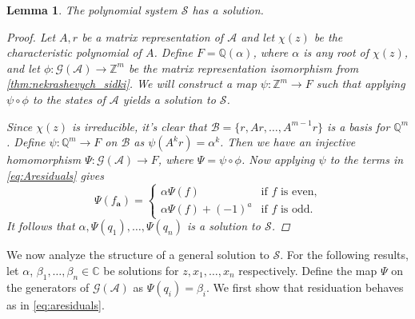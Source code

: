 \documentclass[12pt, letterpaper]{article}
\newcommand{\Z}{\mathbb Z}
\newcommand{\Q}{\mathbb Q}
\newcommand{\C}{\mathbb C}
\newcommand{\A}{\mathcal A}
\newcommand{\ch}[1]{\mathbf{#1}}
\newcommand{\res}[2]{{{#1}_{\ch{#2}}}}
\renewcommand{\S}{\mathcal S}
\newcommand{\gp}{\mathcal G}
\newtheorem{lemma}[thm]{Lemma}
\begin{document}
\begin{lemma}\label{lemma:solution_exists}
    The polynomial system $\S$ has a solution.
    \begin{proof}
        Let $A, r$ be a matrix representation of $\A$ and let $\chi(z)$ be the
        characteristic polynomial of $A$. Define $F = \Q(\alpha)$, where
        $\alpha$ is any root of $\chi(z)$, and let $\phi : \gp(\A) \rightarrow
        \Z^m$ be the matrix representation isomorphism from
        \cref{thm:nekrashevych_sidki}. We will construct a map $\psi: \Z^m
        \rightarrow F$ such that applying $\psi \circ \phi$ to the states of
        $\A$ yields a solution to $\S$.

        Since $\chi(z)$ is irreducible, it's clear that $\mathcal B = \{r, Ar,
        \ldots, A^{m-1}r\}$ is a basis for $\Q^m$.  Define $\psi : \Q^m
        \rightarrow F$ on $\mathcal B$ as $\psi(A^k r) = \alpha^k$.  Then we
        have an injective homomorphism $\Psi: \gp(\A) \rightarrow F$, where
        $\Psi = \psi \circ \phi$.  Now applying $\psi$ to the terms in
        \cref{eq:Aresiduals} gives
        \begin{equation}
            \label{eq:aresiduals} \Psi(\res{f}{a}) = \begin{cases}
                \alpha \Psi(f) & \text{if $f$ is even,}\\
                \alpha \Psi(f) + (-1)^a & \text{if $f$ is odd.}
            \end{cases}
        \end{equation}
        It follows that $\alpha, \Psi(q_1), \ldots, \Psi(q_n)$ is a solution to
        $\S$.
    \end{proof}
\end{lemma}

We now analyze the structure of a general solution to $\S$. For the following
results, let $\alpha$, $\beta_1, \ldots, \beta_n \in \C$ be solutions for $z,
x_1, \ldots, x_n$ respectively. Define the map $\Psi$ on the generators of
$\gp(\A)$ as $\Psi(q_i) = \beta_i$. We first show that residuation behaves as
in \cref{eq:aresiduals}.
\end{document}
